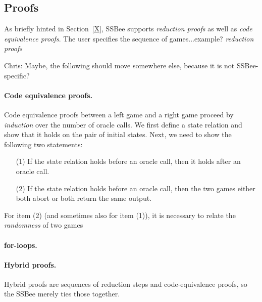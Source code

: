 \subsection{Proofs}
As briefly hinted in Section~\ref{X}, SSBee supports \emph{reduction proofs}
as well as \emph{code equivalence proofs}. The user specifies the sequence
of games...example? \emph{reduction proofs}


{\color{blue}Chris: Maybe, the following should move somewhere else, because
it is not SSBee-specific?}
\paragraph{Code equivalence proofs.} Code equivalence proofs between a left
game and a right game proceed by \emph{induction} over the number of oracle calls. We first define a state relation and show that it holds on the pair of initial
states. Next, we need to show the following two statements:
\begin{itemize}
\item[(1)] If the state relation holds before an oracle call, then it holds after an oracle call.
\item[(2)] If the state relation holds before an oracle call, then the two games either both abort or both return the same output.
\end{itemize}
For item (2) (and sometimes also for item (1)), it is necessary to relate the
\emph{randomness} of two games


\paragraph{for-loops.}



\paragraph{Hybrid proofs.} Hybrid proofs are sequences of reduction steps
and code-equivalence proofs, so the SSBee merely ties those together.

